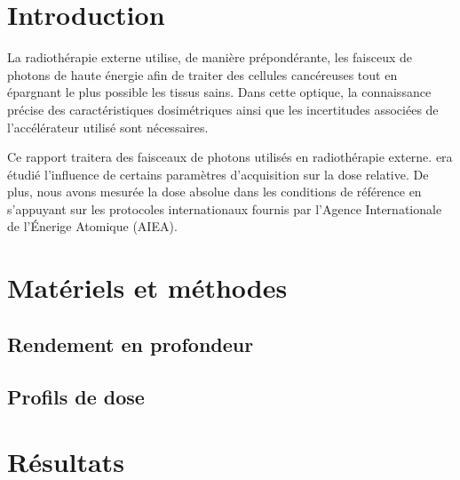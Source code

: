 \documentclass{article}
\begin{document}




\onehalfspacing

\pagestyle{fancy}
	\renewcommand\headrulewidth{0.5pt}
	\renewcommand\footrulewidth{0.5pt}
	\fancyfoot[R]{\thepage}

\tableofcontents
\clearpage
\section{Introduction}

La radiothérapie externe utilise, de manière prépondérante, les faisceux de photons de haute énergie afin de traiter des cellules cancéreuses tout en épargnant le plus possible les tissus sains. Dans cette optique, la connaissance précise des caractéristiques dosimétriques ainsi que les incertitudes associées de l'accélérateur utilisé sont nécessaires. 

Ce rapport traitera des faisceaux de photons utilisés en radiothérapie externe. era étudié l'influence de certains paramètres d'acquisition sur la dose relative. De plus, nous avons mesurée la dose absolue dans les conditions de référence en s'appuyant sur les protocoles internationaux fournis par l'Agence Internationale de l'Énerige Atomique (AIEA).

\section{Matériels et méthodes}
\subsection{Rendement en profondeur}


\subsection{Profils de dose}



\clearpage
\section{Résultats}
\end{document}
